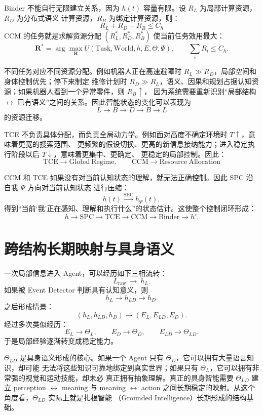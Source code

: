 Binder 不能自行无限建立关系，因为 $h(t)$ 容量有限。设 $R_L$ 为局部计算资源，$R_D$ 为分布式语义
计算资源，$R_B$ 为绑定计算资源，则：
\[
\boxed{
R_L+R_D+R_B\leq C_h
}
\]
CCM 的任务就是求解资源分配 $(R_L^*,R_D^*,R_B^*)$ 使当前任务效用最大：
\[
\mathbf R^*
=
\arg\max_{\mathbf R}
U(\mathrm{Task},\mathrm{World},h,E,\Theta,\Psi),
\qquad
\sum_iR_i\leq C_h .
\]

不同任务对应不同资源分配。例如机器人正在高速避障时 $R_L\gg R_D$，局部空间和身体控制优先；停下来制定
维修计划时 $R_D\gg R_L$，语义、因果和规划占据认知资源；如果机器人看到一个异常零件，则 $R_B\uparrow$，
因为系统需要重新识别“局部结构 $\leftrightarrow$ 已有语义”之间的关系。因此智能状态的变化可以表现为
\[
\boxed{
L\rightarrow B\rightarrow D\rightarrow B\rightarrow L
}
\]
的资源迁移。

TCE 不负责具体分配，而负责全局动力学。例如面对高度不确定环境时 $T\uparrow$，意味着更宽的搜索范围、
更频繁的假设切换、更高的新信息接纳能力；进入稳定执行阶段以后 $T\downarrow$，意味着更集中、更确定、
更稳定的局部控制。因此：
\[
\boxed{
\mathrm{TCE}\rightarrow\mathrm{Global\ Regime},
\qquad
\mathrm{CCM}\rightarrow\mathrm{Resource\ Allocation}
}
\]

CCM 和 TCE 如果没有对当前认知状态的理解，就无法正确控制。因此 SPC 沿自我 $\Psi$ 方向对当前认知状态
进行压缩：
\[
h(t)\xrightarrow{\mathrm{SPC}}\hat h_\Psi(t),
\]
得到“当前‘我’正在感知、理解和执行什么”的状态估计。这使整个控制闭环形成：
\[
h\rightarrow\mathrm{SPC}\rightarrow\mathrm{TCE}\rightarrow\mathrm{CCM}\rightarrow\mathrm{Binder}\rightarrow h'.
\]

\section{跨结构长期映射与具身语义}

一次局部信息进入 Agent，可以经历如下三相流转：
\[
L_{\mathrm{raw}}\ \longrightarrow\ h_L.
\]
如果被 Event Detector 判断具有认知意义，则
\[
h_L\rightarrow h_{LD}\rightarrow h_D.
\]
之后形成情景：
\[
(h_L,h_{LD},h_D)\rightarrow(E_L,E_{LD},E_D).
\]
经过多次类似经历：
\[
E_L\rightarrow\Theta_L,
\qquad
E_D\rightarrow\Theta_D,
\qquad
E_{LD}\rightarrow\Theta_{LD}.
\]
于是局部经验逐渐转变成稳定能力。

$\Theta_{LD}$ 是具身语义形成的核心。如果一个 Agent 只有 $\Theta_D$，它可以拥有大量语言知识，却可能
无法将这些知识可靠地绑定到真实世界；如果只有 $\Theta_L$，它可以拥有非常强的视觉和运动技能，却未必
真正拥有抽象理解。真正的具身智能需要 $\Theta_{LD}$ 建立 perception $\leftrightarrow$ meaning 与
meaning $\leftrightarrow$ action 之间长期稳定的映射。从这个角度看，$\Theta_{LD}$ 实际上就是扎根智能
（Grounded Intelligence）长期形成的结构基础。

